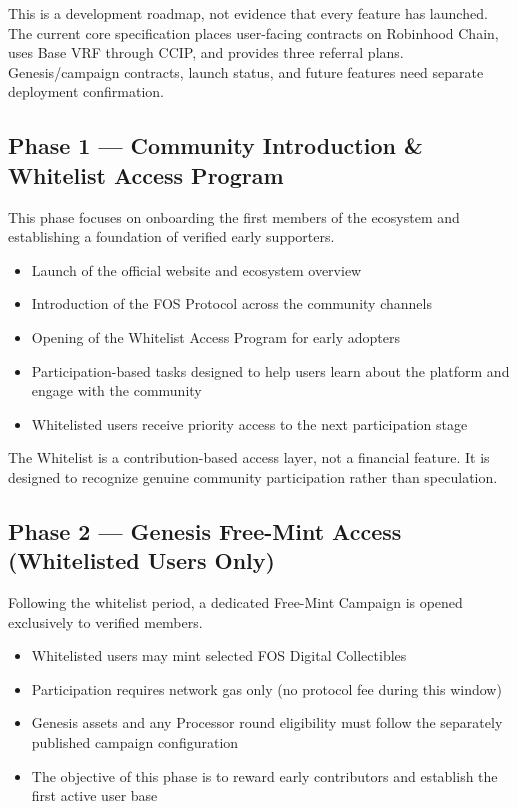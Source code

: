 \documentclass[
  10pt,
  letterpaper,
]{article}
\providecommand{\tightlist}{%
  \setlength{\itemsep}{0pt}\setlength{\parskip}{0pt}}
\begin{document}
This is a development roadmap, not evidence that every feature has
launched. The current core specification places user-facing contracts on
Robinhood Chain, uses Base VRF through CCIP, and provides three referral
plans. Genesis/campaign contracts, launch status, and future features
need separate deployment confirmation.

\subsection{Phase 1 --- Community Introduction \& Whitelist Access
Program}\label{phase-1-community-introduction-whitelist-access-program}

This phase focuses on onboarding the first members of the ecosystem and
establishing a foundation of verified early supporters.

\begin{itemize}
\tightlist
\item
  Launch of the official website and ecosystem overview
\item
  Introduction of the FOS Protocol across the community channels
\item
  Opening of the Whitelist Access Program for early adopters
\item
  Participation-based tasks designed to help users learn about the
  platform and engage with the community
\item
  Whitelisted users receive priority access to the next participation
  stage
\end{itemize}

The Whitelist is a contribution-based access layer, not a financial
feature. It is designed to recognize genuine community participation
rather than speculation.

\subsection{Phase 2 --- Genesis Free-Mint Access (Whitelisted Users
Only)}\label{phase-2-genesis-free-mint-access-whitelisted-users-only}

Following the whitelist period, a dedicated Free-Mint Campaign is opened
exclusively to verified members.

\begin{itemize}
\tightlist
\item
  Whitelisted users may mint selected FOS Digital Collectibles
\item
  Participation requires network gas only (no protocol fee during this
  window)
\item
  Genesis assets and any Processor round eligibility must follow the
  separately published campaign configuration
\item
  The objective of this phase is to reward early contributors and
  establish the first active user base
\end{itemize}
\end{document}
